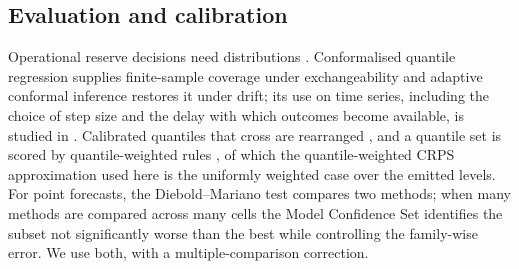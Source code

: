 \subsection{Evaluation and calibration}
Operational reserve decisions need distributions \cite{hong2016tutorial,gneiting2007scoring}.
Conformalised quantile regression \cite{romano2019cqr} supplies finite-sample coverage under
exchangeability and adaptive conformal inference \cite{gibbs2021aci} restores it under drift;
its use on time series, including the choice of step size and the delay with which outcomes
become available, is studied in \cite{zaffran2022aci}. Calibrated quantiles that cross are
rearranged \cite{chernozhukov2010rearrangement}, and a quantile set is scored by
quantile-weighted rules \cite{gneiting2011quantile}, of which the quantile-weighted CRPS
approximation used here is the uniformly weighted case over the emitted levels. For point
forecasts, the Diebold--Mariano test \cite{diebold1995dm,harvey1997dm} compares two
methods; when many methods are compared across many cells the Model Confidence Set
\cite{hansen2011mcs} identifies the subset not significantly worse than the best while
controlling the family-wise error. We use both, with a multiple-comparison correction.
